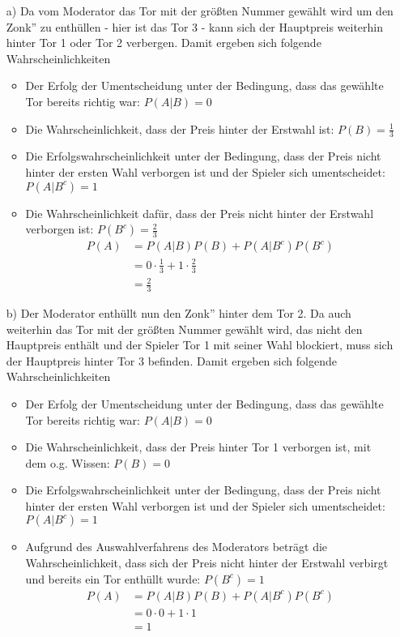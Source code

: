 \begin{enumerate}
	\item[a)] Da vom Moderator das Tor mit der größten Nummer gewählt wird um den \glqq Zonk'' zu enthüllen - hier ist das Tor 3 - kann sich der Hauptpreis weiterhin hinter Tor 1 oder Tor 2 verbergen. Damit ergeben sich folgende Wahrscheinlichkeiten
		\begin{itemize}
			\item Der Erfolg der Umentscheidung unter der Bedingung, dass das gewählte Tor bereits richtig war: $P(A|B) = 0$
			\item Die Wahrscheinlichkeit, dass der Preis hinter der Erstwahl ist: $P(B)=\frac{1}{3}$
			\item Die Erfolgswahrscheinlichkeit unter der Bedingung, dass der Preis nicht hinter der ersten Wahl verborgen ist und der Spieler sich umentscheidet: $P(A|B^c)=1$
			\item Die Wahrscheinlichkeit dafür, dass der Preis nicht hinter der Erstwahl verborgen ist: $P(B^c)=\frac{2}{3}$
			\begin{equation*}
				\begin{split}
					P(A) 	&= P(A|B)P(B) + P(A|B^c)P(B^c)\\
							&= 0 \cdot \frac{1}{3} + 1 \cdot \frac{2}{3}\\
							&= \frac{2}{3}
				\end{split}
			\end{equation*} 
		\end{itemize}
	\item[b)] Der Moderator enthüllt nun den \glqq Zonk'' hinter dem Tor 2. Da auch weiterhin das Tor mit der größten Nummer gewählt wird, das nicht den Hauptpreis enthält und der Spieler Tor 1 mit seiner Wahl blockiert, muss sich der Hauptpreis hinter Tor 3 befinden. Damit ergeben sich folgende Wahrscheinlichkeiten
		\begin{itemize}
			\item Der Erfolg der Umentscheidung unter der Bedingung, dass das gewählte Tor bereits richtig war: $P(A|B) = 0$
			\item Die Wahrscheinlichkeit, dass der Preis hinter Tor 1 verborgen ist, mit dem o.g. Wissen: $P(B) = 0$
			\item Die Erfolgswahrscheinlichkeit unter der Bedingung, dass der Preis nicht hinter der ersten Wahl verborgen ist und der Spieler sich umentscheidet: $P(A|B^c)=1$
			\item Aufgrund des Auswahlverfahrens des Moderators beträgt die Wahrscheinlichkeit, dass sich der Preis nicht hinter der Erstwahl verbirgt und bereits ein Tor enthüllt wurde: $P(B^c) = 1$
			\begin{equation*}
				\begin{split}
					P(A) 	&= P(A|B)P(B) + P(A|B^c)P(B^c)\\
							&= 0 \cdot 0 + 1 \cdot 1\\
							&= 1
				\end{split}
			\end{equation*}

		\end{itemize}
\end{enumerate}
